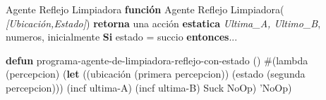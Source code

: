\usepackage{algpseudocode}

\begin{frame}{Agente Reflejo Limpiadora}
\textbf{función} Agente Reflejo Limpiadora( \textit{[Ubicación,Estado]}) \textbf{retorna} una acción \break
\textbf{estatica} \textit{Ultima\_A, Ultimo\_B}, numeros, inicialmente \infty \break
\textbf{Si } estado = succio \textbf{ entonces}...\break
\begin{algorithmic}
\textbf{defun} programa-agente-de-limpiadora-reflejo-con-estado ()\break
 \break
 \State \#(lambda (percepcion)\break
(\textbf{let} ((ubicación (primera percepcion)) (estado (segunda percepcion)))\break
(incf ultima-A) (incf ultima-B)\break
{}\break
{} Suck\break
{}\break
{} NoOp)\break
{} \break
{} 'NoOp)\break
\end{algorithmic}
\end{frame}